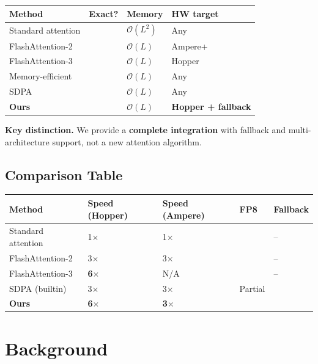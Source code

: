\begin{table}[H]
\centering
\small
\begin{tabular}{llll}
\toprule
\textbf{Method} & \textbf{Exact?} & \textbf{Memory} & \textbf{HW target} \\
\midrule
Standard attention &  & $\mathcal{O}(L^2)$ & Any \\
FlashAttention-2 &  & $\mathcal{O}(L)$ & Ampere+ \\
FlashAttention-3 &  & $\mathcal{O}(L)$ & Hopper \\
Memory-efficient &  & $\mathcal{O}(L)$ & Any \\
SDPA &  & $\mathcal{O}(L)$ & Any \\
\textbf{Ours} &  & $\mathcal{O}(L)$ & \textbf{Hopper + fallback} \\
\bottomrule
\end{tabular}
\end{table}

\textbf{Key distinction.} We provide a \textbf{complete integration} with fallback 
and multi-architecture support, not a new attention algorithm.



\subsection{Comparison Table}

\begin{table}[H]
\centering
\small
\begin{tabular}{lllll}
\toprule
\textbf{Method} & \textbf{Speed (Hopper)} & \textbf{Speed (Ampere)} & \textbf{FP8} & \textbf{Fallback} \\
\midrule
Standard attention & 1$\times$ & 1$\times$ &  & -- \\
FlashAttention-2 & 3$\times$ & 3$\times$ &  & -- \\
FlashAttention-3 & \textbf{6$\times$} & N/A &  & -- \\
SDPA (builtin) & 3$\times$ & 3$\times$ & Partial &  \\
\textbf{Ours} & \textbf{6$\times$} & \textbf{3$\times$} &  &  \\
\bottomrule
\end{tabular}
\end{table}



\section{Background}


